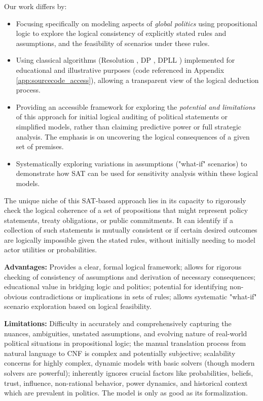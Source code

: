 \documentclass[11pt, a4paper]{article}
\begin{document}
Our work differs by:
\begin{itemize}
    \item Focusing specifically on modeling aspects of \textit{global politics} using propositional logic to explore the logical consistency of explicitly stated rules and assumptions, and the feasibility of scenarios under these rules.
    \item Using classical algorithms (Resolution \cite{Robinson1965}, DP \cite{DavisPutnam1960}, DPLL \cite{DPLL1962}) implemented for educational and illustrative purposes (code referenced in Appendix \ref{app:sourcecode_access}), allowing a transparent view of the logical deduction process.
    \item Providing an accessible framework for exploring the \textit{potential and limitations} of this approach for initial logical auditing of political statements or simplified models, rather than claiming predictive power or full strategic analysis. The emphasis is on uncovering the logical consequences of a given set of premises.
    \item Systematically exploring variations in assumptions ("what-if" scenarios) to demonstrate how SAT can be used for sensitivity analysis within these logical models.
\end{itemize}

The unique niche of this SAT-based approach lies in its capacity to rigorously check the logical coherence of a set of propositions that might represent policy statements, treaty obligations, or public commitments. It can identify if a collection of such statements is mutually consistent or if certain desired outcomes are logically impossible given the stated rules, without initially needing to model actor utilities or probabilities.

\textbf{Advantages:} Provides a clear, formal logical framework; allows for rigorous checking of consistency of assumptions and derivation of necessary consequences; educational value in bridging logic and politics; potential for identifying non-obvious contradictions or implications in sets of rules; allows systematic "what-if" scenario exploration based on logical feasibility.

\textbf{Limitations:} Difficulty in accurately and comprehensively capturing the nuances, ambiguities, unstated assumptions, and evolving nature of real-world political situations in propositional logic; the manual translation process from natural language to CNF is complex and potentially subjective; scalability concerns for highly complex, dynamic models with basic solvers (though modern solvers are powerful); inherently ignores crucial factors like probabilities, beliefs, trust, influence, non-rational behavior, power dynamics, and historical context which are prevalent in politics. The model is only as good as its formalization.
\end{document}
